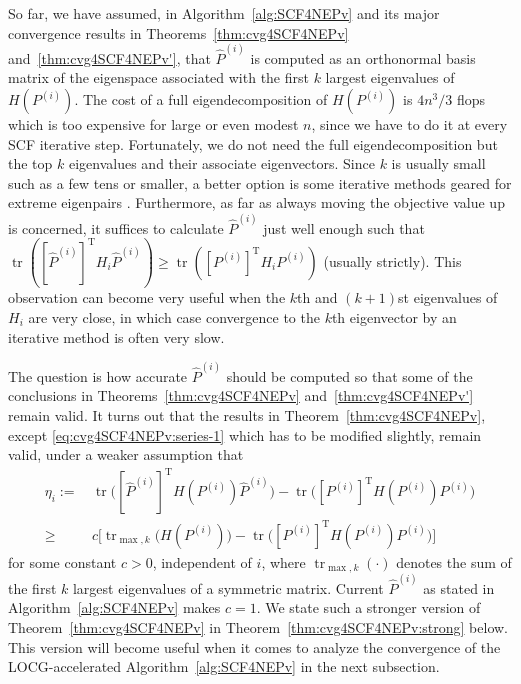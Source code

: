 \documentclass[11pt]{article}
\def\what{\widehat}
\DeclareMathOperator{\tr}{tr}
\DeclareMathOperator{\T}{T}
\theoremstyle{definition}
\numberwithin{equation}{section}
\begin{document}
So far, we have assumed, in Algorithm~\ref{alg:SCF4NEPv} and its major convergence results in
Theorems~\ref{thm:cvg4SCF4NEPv} and~\ref{thm:cvg4SCF4NEPv'}, that
$\what P^{(i)}$ is computed as an orthonormal basis matrix of the eigenspace
associated with the first $k$ largest eigenvalues of $H(P^{(i)})$.
%
The cost of a full eigendecomposition of $H(P^{(i)})$ is $4n^3/3$ flops \cite[p.463]{govl:2013} which is too expensive
for large or even modest $n$,  since we have to do it at every SCF iterative step.
Fortunately, we do not need the full eigendecomposition but the top $k$ eigenvalues and their associate eigenvectors.
Since $k$ is usually small such as a few tens or smaller, a better option is some iterative methods geared for
extreme eigenpairs \cite{goye:2002,knya:2001,li:2015,quye:2010}.
Furthermore, as far as always moving the objective value up is concerned,
it suffices to calculate $\what P^{(i)}$ just well enough such that
$\tr([\what P^{(i)}]^{\T}H_i\what P^{(i)})\ge \tr([P^{(i)}]^{\T}H_i P^{(i)})$ (usually strictly). This observation can become very useful when
the $k$th and $(k+1)$st eigenvalues of $H_i$ are very close, in which case convergence to the $k$th eigenvector by
an iterative method is often very slow.
%

The question is how accurate $\what P^{(i)}$ should be computed so that some of the conclusions in
Theorems~\ref{thm:cvg4SCF4NEPv} and~\ref{thm:cvg4SCF4NEPv'} remain valid.
It turns out
that the results in Theorem~\ref{thm:cvg4SCF4NEPv}, except \eqref{eq:cvg4SCF4NEPv:series-1} which
has to be modified slightly, remain
valid, under a weaker assumption that
\begin{align}
\eta_i:=\,&\tr\big([\what P^{(i)}]^{\T}H(P^{(i)})\what P^{(i)}\big)-\tr\big([P^{(i)}]^{\T}H(P^{(i)}) P^{(i)}\big)
             \label{eq:NEPv:eta(i):dfn} \\
      \ge\,&c\Big[\tr_{\max,k}\big(H(P^{(i)})\big)-\tr\big([P^{(i)}]^{\T}H(P^{(i)})P^{(i)}\big)\Big]
             \label{eq:NEPv:eta(i):weak}
\end{align}
for some constant $c>0$, independent of $i$, where $\tr_{\max,k}(\cdot)$ denotes the sum of the first $k$ largest eigenvalues of a symmetric matrix. Current $\what P^{(i)}$ as stated in Algorithm~\ref{alg:SCF4NEPv} makes $c=1$.
We state such a stronger version of Theorem~\ref{thm:cvg4SCF4NEPv}
in Theorem~\ref{thm:cvg4SCF4NEPv:strong} below.
This version will become useful when it comes to analyze the convergence of
the LOCG-accelerated Algorithm~\ref{alg:SCF4NEPv} in the next subsection.
\end{document}
